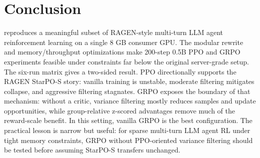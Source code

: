 \section{Conclusion}
\label{sec:conclusion}

\method{} reproduces a meaningful subset of RAGEN-style multi-turn LLM agent reinforcement learning on a single 8 GB consumer GPU. The modular rewrite and memory/throughput optimizations make 200-step 0.5B PPO and GRPO experiments feasible under constraints far below the original server-grade setup. The six-run matrix gives a two-sided result. PPO directionally supports the RAGEN StarPO-S story: vanilla training is unstable, moderate filtering mitigates collapse, and aggressive filtering stagnates. GRPO exposes the boundary of that mechanism: without a critic, variance filtering mostly reduces samples and update opportunities, while group-relative z-scored advantages remove much of the reward-scale benefit. In this setting, vanilla GRPO is the best configuration. The practical lesson is narrow but useful: for sparse multi-turn LLM agent RL under tight memory constraints, GRPO without PPO-oriented variance filtering should be tested before assuming StarPO-S transfers unchanged.
